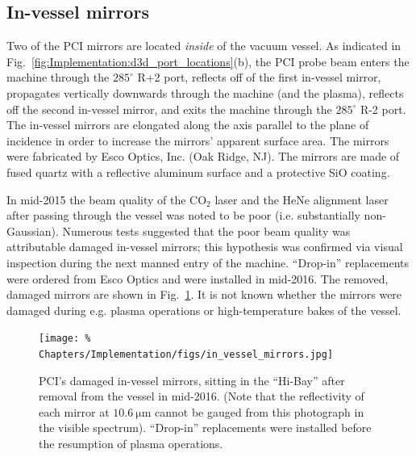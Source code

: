 \subsection{In-vessel mirrors}
Two of the PCI mirrors are located
\emph{inside} of the \diiid \space vacuum vessel.
As indicated in Fig.~\ref{fig:Implementation:d3d_port_locations}(b),
the PCI probe beam enters the machine through the $285^{\circ}$ R+2 port,
reflects off of the first in-vessel mirror,
propagates vertically downwards through the machine (and the plasma),
reflects off the second in-vessel mirror, and
exits the machine through the $285^{\circ}$ R-2 port.
The in-vessel mirrors are elongated
along the axis parallel to the plane of incidence
in order to increase the mirrors' apparent surface area.
The mirrors were fabricated by Esco Optics, Inc. (Oak Ridge, NJ).
The mirrors are made of fused quartz with
a reflective aluminum surface and a protective SiO coating.

In mid-2015 the beam quality of the CO$_2$ laser and the HeNe alignment laser
after passing through the \diiid \space vessel was noted to be poor
(i.e. substantially non-Gaussian).
Numerous tests suggested that the poor beam quality was attributable
damaged in-vessel mirrors;
this hypothesis was confirmed via visual inspection
during the next manned entry of the machine.
``Drop-in'' replacements were ordered from Esco Optics
and were installed in mid-2016.
The removed, damaged mirrors are shown in
Fig.~\ref{fig:Implementation:in_vessel_mirrors}.
It is not known whether the mirrors were damaged
during e.g. plasma operations or high-temperature bakes of the vessel.

\begin{figure}
  \centering
  \texttt{[image: \%
    Chapters/Implementation/figs/in\_vessel\_mirrors.jpg]}
  \caption[PCI's damaged in-vessel mirrors]{%
    PCI's damaged in-vessel mirrors, sitting
    in the \diiid \space ``Hi-Bay''
    after removal from the vessel in mid-2016.
    (Note that the reflectivity of each mirror at $\SI{10.6}{\micro\meter}$
    cannot be gauged from this photograph in the visible spectrum).
    ``Drop-in'' replacements were installed
    before the resumption of plasma operations.}
\label{fig:Implementation:in_vessel_mirrors}
\end{figure}




